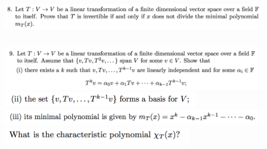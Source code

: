 \documentclass[12pt]{article}
\begin{document}
\subsection*{} %
\includegraphics[width=400pt]{img/linear-algebra-a0-1-8.png}\\
\begin{mdframed}
\end{mdframed}

\subsection*{} %
\includegraphics[width=400pt]{img/linear-algebra-a0-1-9-a.png}\\
\includegraphics[width=280pt]{img/linear-algebra-a0-1-9-b.png}\\
\includegraphics[width=400pt]{img/linear-algebra-a0-1-9-c.png}\\
\includegraphics[width=270pt]{img/linear-algebra-a0-1-9-d.png}\\
\begin{mdframed}
\end{mdframed}
\end{document}
